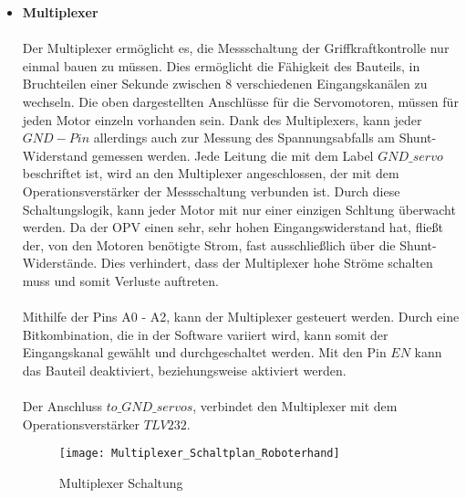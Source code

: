 \documentclass[titlepage,12pt,twoside]{article}
\begin{document}
\begin{itemize}
	\item \textbf{Multiplexer} \\
	\\
	Der Multiplexer ermöglicht es, die Messschaltung der Griffkraftkontrolle nur einmal bauen zu müssen. Dies ermöglicht die Fähigkeit des Bauteils, in Bruchteilen einer Sekunde zwischen 8 verschiedenen Eingangskanälen zu wechseln.
	Die oben dargestellten Anschlüsse für die Servomotoren, müssen für jeden Motor einzeln vorhanden sein. Dank des Multiplexers, kann jeder $GND-Pin$ allerdings auch zur Messung des Spannungsabfalls am Shunt-Widerstand gemessen werden.
	Jede Leitung die mit dem Label $GND\_servo$ beschriftet ist, wird an den Multiplexer angeschlossen, der mit dem Operationsverstärker der Messschaltung verbunden ist. Durch diese Schaltungslogik, kann jeder Motor mit nur einer einzigen
	Schltung überwacht werden. Da der OPV einen sehr, sehr hohen Eingangswiderstand hat, fließt der, von den Motoren benötigte Strom, fast ausschließlich über die Shunt-Widerstände. Dies verhindert, dass der Multiplexer hohe Ströme
	schalten muss und somit Verluste auftreten. \\
	\\
	Mithilfe der Pins A0 - A2, kann der Multiplexer gesteuert werden. Durch eine Bitkombination, die in der Software variiert wird, kann somit der Eingangskanal gewählt und durchgeschaltet werden. Mit den Pin $EN$ kann das Bauteil deaktiviert,
	beziehungsweise aktiviert werden. \\
	\\
	Der Anschluss $to\_GND\_servos$, verbindet den Multiplexer mit dem Operationsverstärker $TLV232$.
	\\
	\begin{figure}[H]
		\begin{center}
			\scalebox{0.6}
			{\texttt{[image: Multiplexer\_Schaltplan\_Roboterhand]}}
			\caption{Multiplexer Schaltung}
			\label{fig:Multiplexer_Schaltplan_Roboterhand}		
			\end{center}
	\end{figure}
	\hfill \break


\end{itemize}
\end{document}
